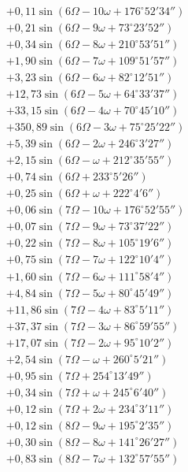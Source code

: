 \documentclass[10pt,a4paper]{article}
\begin{document}
\begin{align*}
&+ 0,11 \sin(6\Omega - 10\omega + 176^{\circ}52'34'') \\
&+ 0,21 \sin(6\Omega - 9\omega + 73^{\circ}23'52'') \\
&+ 0,34 \sin(6\Omega - 8\omega + 210^{\circ}53'51'') \\
&+ 1,90 \sin(6\Omega - 7\omega + 109^{\circ}51'57'') \\
&+ 3,23 \sin(6\Omega - 6\omega + 82^{\circ}12'51'') \\
&+ 12,73 \sin(6\Omega - 5\omega + 64^{\circ}33'37'') \\
&+ 33,15 \sin(6\Omega - 4\omega + 70^{\circ}45'10'') \\
&+ 350,89 \sin(6\Omega - 3\omega + 75^{\circ}25'22'') \\
&+ 5,39 \sin(6\Omega - 2\omega + 246^{\circ}3'27'') \\
&+ 2,15 \sin(6\Omega - \omega + 212^{\circ}35'55'') \\
&+ 0,74 \sin(6\Omega + 233^{\circ}5'26'') \\
&+ 0,25 \sin(6\Omega + \omega + 222^{\circ}4'6'') \\
&+ 0,06 \sin(7\Omega - 10\omega + 176^{\circ}52'55'') \\
&+ 0,07 \sin(7\Omega - 9\omega + 73^{\circ}37'22'') \\
&+ 0,22 \sin(7\Omega - 8\omega + 105^{\circ}19'6'') \\
&+ 0,75 \sin(7\Omega - 7\omega + 122^{\circ}10'4'') \\
&+ 1,60 \sin(7\Omega - 6\omega + 111^{\circ}58'4'') \\
&+ 4,84 \sin(7\Omega - 5\omega + 80^{\circ}45'49'') \\
&+ 11,86 \sin(7\Omega - 4\omega + 83^{\circ}5'11'') \\
&+ 37,37 \sin(7\Omega - 3\omega + 86^{\circ}59'55'') \\
&+ 17,07 \sin(7\Omega - 2\omega + 95^{\circ}10'2'') \\
&+ 2,54 \sin(7\Omega - \omega + 260^{\circ}5'21'') \\
&+ 0,95 \sin(7\Omega + 254^{\circ}13'49'') \\
&+ 0,34 \sin(7\Omega + \omega + 245^{\circ}6'40'') \\
&+ 0,12 \sin(7\Omega + 2\omega + 234^{\circ}3'11'') \\
&+ 0,12 \sin(8\Omega - 9\omega + 195^{\circ}2'35'') \\
&+ 0,30 \sin(8\Omega - 8\omega + 141^{\circ}26'27'') \\
&+ 0,83 \sin(8\Omega - 7\omega + 132^{\circ}57'55'')
\end{align*}
\end{document}
